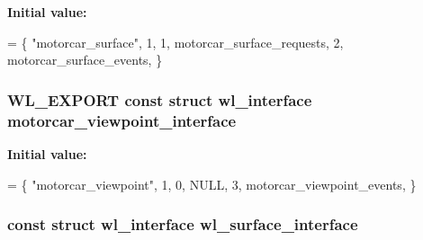 {\bfseries Initial value\-:}
\begin{DoxyCode}
= \{
    \textcolor{stringliteral}{"motorcar\_surface"}, 1,
    1, motorcar\_surface\_requests,
    2, motorcar\_surface\_events,
\}
\end{DoxyCode}
\hypertarget{motorcar-wayland-extensions_8c_a75e24dc8eb5259b6e2ec9ac54c4a201b}{
\subsubsection[{motorcar\-\_\-viewpoint\-\_\-interface}]{\setlength{\rightskip}{0pt plus 5cm}W\-L\-\_\-\-E\-X\-P\-O\-R\-T const struct wl\-\_\-interface motorcar\-\_\-viewpoint\-\_\-interface}}\label{motorcar-wayland-extensions_8c_a75e24dc8eb5259b6e2ec9ac54c4a201b}
{\bfseries Initial value\-:}
\begin{DoxyCode}
= \{
    \textcolor{stringliteral}{"motorcar\_viewpoint"}, 1,
    0, NULL,
    3, motorcar\_viewpoint\_events,
\}
\end{DoxyCode}
\hypertarget{motorcar-wayland-extensions_8c_ab5b94bcc25b21d2fdd945533016d0e33}{
\subsubsection[{wl\-\_\-surface\-\_\-interface}]{\setlength{\rightskip}{0pt plus 5cm}const struct wl\-\_\-interface wl\-\_\-surface\-\_\-interface}}\label{motorcar-wayland-extensions_8c_ab5b94bcc25b21d2fdd945533016d0e33}
